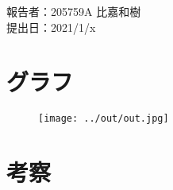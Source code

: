 \documentclass[11pt, a4paper]{jsarticle}
\begin{document}
\noindent
報告者：205759A 比嘉和樹\\
提出日：2021/1/x

\section{グラフ}
\begin{figure}
	\centering
	\texttt{[image: ../out/out.jpg]}
\end{figure}
\section{考察}
\end{document}
